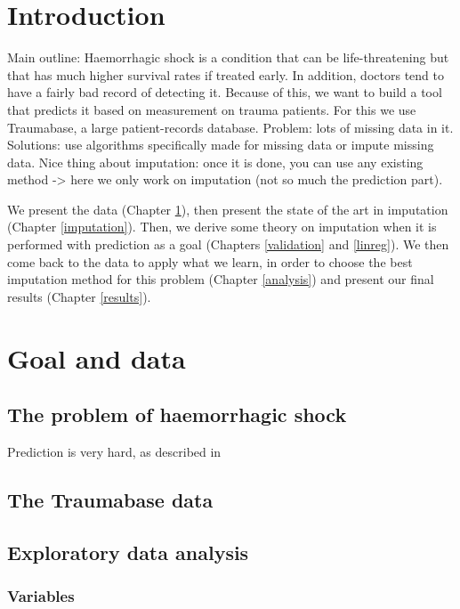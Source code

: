 \documentclass[12pt, a4paper]{memoir}
\begin{document}
\tableofcontents*
\vspace*{\fill}

\chapter*{Introduction}
Main outline: Haemorrhagic shock is a condition that can be life-threatening but that has much higher survival rates if treated early. In addition, doctors tend to have a fairly bad record of detecting it. Because of this, we want to build a tool that predicts it based on measurement on trauma patients. For this we use Traumabase, a large patient-records database. Problem: lots of missing data in it. Solutions: use algorithms specifically made for missing data or impute missing data. Nice thing about imputation: once it is done, you can use any existing method -> here we only work on imputation (not so much the prediction part).

We present the data (Chapter \ref{data}), then present the state of the art in imputation (Chapter \ref{imputation}). Then, we derive some theory on imputation when it is performed with prediction as a goal (Chapters \ref{validation} and \ref{linreg}). We then come back to the data to apply what we learn, in order to choose the best imputation method for this problem (Chapter \ref{analysis}) and present our final results (Chapter \ref{results}).

\chapter{Goal and data}
\label{data}
	\section{The problem of haemorrhagic shock}
	Prediction is very hard, as described in \cite{doctors_prediction}
	\section{The Traumabase data}
	\section{Exploratory data analysis}
		\subsection{Variables}
\end{document}
